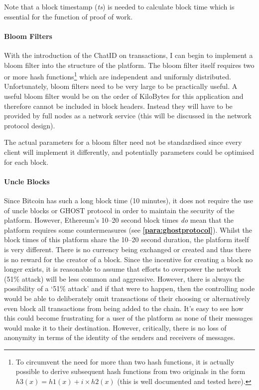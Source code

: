 \documentclass{article}
\begin{document}
Note that a block timestamp (\textit{ts}) is needed to calculate block time which is essential for the function of proof of work.

\paragraph{Bloom Filters}
With the introduction of the ChatID on transactions, I can begin to implement a bloom filter into the structure of the platform. The bloom filter itself requires two or more hash functions\footnote{To circumvent the need for more than two hash functions, it is actually possible to derive subsequent hash functions from two originals in the form $h3(x) = h1(x) + i \times h2(x)$ (this is well documented and tested here\cite{harvard_better_bloom_filters}).} which are independent and uniformly distributed. Unfortunately, bloom filters need to be very large to be practically useful. A useful bloom filter would be on the order of KiloBytes for this application and therefore cannot be included in block headers. Instead they will have to be provided by full nodes as a network service (this will be discussed in the network protocol design).

The actual parameters for a bloom filter need not be standardised since every client will implement it differently, and potentially parameters could be optimised for each block.

\paragraph{Uncle Blocks}
Since Bitcoin has such a long block time (10 minutes), it does not require the use of uncle blocks or GHOST protocol in order to maintain the security of the platform. However, Ethereum's 10--20 second block times \textit{do} mean that the platform requires some countermeasures (see \textbf{\autoref{para:ghostprotocol}}). Whilst the block times of this platform share the 10--20 second duration, the platform itself is very different. There is no currency being exchanged or created and thus there is no reward for the creator of a block. Since the incentive for creating a block no longer exists, it is reasonable to assume that efforts to overpower the network (51\% attack) will be less common and aggressive. However, there is always the possibility of a `51\% attack' and if that were to happen, then the controlling node would be able to deliberately omit transactions of their choosing or alternatively even block all transactions from being added to the chain. It's easy to see how this could become frustrating for a user of the platform as none of their messages would make it to their destination. However, critically, there is no loss of anonymity in terms of the identity of the senders and receivers of messages.
\end{document}

